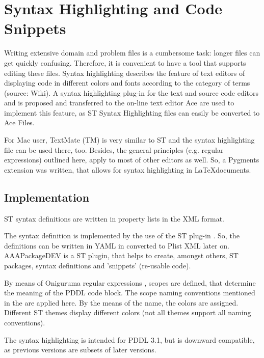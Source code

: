 \documentclass[11pt]{report}
\begin{document}
\section{Syntax Highlighting and Code Snippets}
\label{sec-4-2}
\label{sec:syntax}


Writing extensive domain and problem files is a cumbersome task:
longer files can get quickly confusing. Therefore, it is convenient to
have a tool that supports editing these files. Syntax highlighting
describes the feature of text editors of displaying code in different
colors and fonts according to the category of terms (source: Wiki). A
syntax highlighting plug-in for the text and source code editors
\textcite{sublimetext2} and \textcite{sublimetext3} is proposed and
transferred to the on-line text editor Ace are used to implement this
feature, as ST Syntax Highlighting files can easily be converted to
Ace Files. 

For Mac user, TextMate (TM) is very similar to ST and the syntax
highlighting file can be used there, too. Besides, the general
principles (e.g. regular expressions) outlined here, apply to most of
other editors as well. So, a Pygments extension was written, that
allows for syntax highlighting in \LaTeX documents.


\subsection{Implementation}
\label{sec-4-2-1}
ST syntax definitions are written in property lists in the XML format.

The syntax definition is implemented by the use of the ST plug-in
\textcite{aaapackagedev}. So, the definitions can be written in YAML
in converted to Plist XML later on.
AAAPackageDEV\textcite{aaapackagedev} is a ST plugin, that helps to
create, amongst others, ST packages, syntax definitions and 'snippets'
(re-usable code).

By means of Oniguruma regular expressions \parencite{kosako}, scopes
are defined, that determine the meaning of the PDDL code block. The
scope naming conventions mentioned in the  are
applied here. By the means of the name, the colors are assigned.
Different ST themes display different colors (not all themes support
all naming conventions).

The syntax highlighting is intended for PDDL 3.1, but is downward
compatible, as previous versions are subsets of later versions.
\begin{center}
\end{center}
\end{document}
